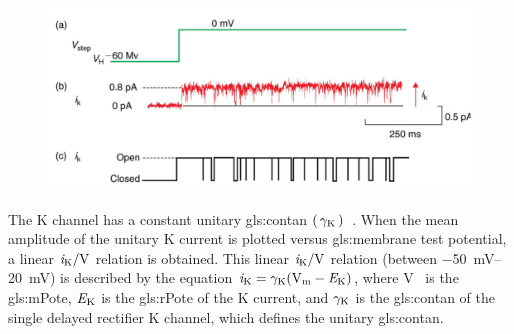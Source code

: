 \documentclass[class={myRUCProject}, crop=false]{standalone}
\begin{document}
\begin{figure}[H]
    \centering
    \includegraphics[width=0.8\linewidth]{Pictures//Anakin/Kchannel.png}
    \caption{}\label{fig:Kchannel}
 \end{figure}

The \gls{K} channel has a constant unitary \gls{gls:contan} \(\left(\,\gamma_\mathrm{K}\,\right)\)~\cite{Hammond2015ch4}. 
When the mean amplitude of the unitary \gls{K} current is plotted versus \gls{gls:membrane} test potential, a linear \(\ucur\potassium/\unit{\V}\) relation is obtained. This linear \(\ucur\potassium/\unit{\V}\) relation (between \qtyrange{-50}{20}{\mV}) is described by the equation \(\ucur\potassium = \ucon\potassium(\unit{\V\membrane}-\equi\potassium)\), where \unit{\V\membrane} is the \gls{gls:mPote}, \(\mathit{E}_\mathrm{K}\) is the \gls{gls:rPote} of the \gls{K} current, and \(\gamma_\mathrm{K}\) is the \gls{gls:contan} of the single delayed rectifier \gls{K} channel, which defines the unitary \gls{gls:contan}. 

\end{document}
